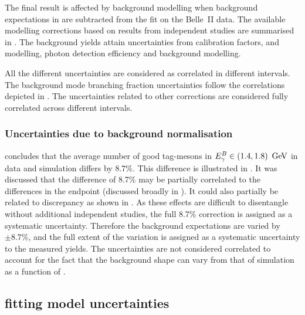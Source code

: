 The final result is affected by background modelling when background expectations in \MC are subtracted from the \Mbc fit on the Belle~II data.
The available modelling corrections based on results from independent studies are summarised in .
The background yields attain uncertainties from \FEI calibration factors, \piVeto and \etaVeto modelling, photon detection efficiency and background modelling. 

All the different uncertainties are considered as correlated in different \EB intervals.
The background mode branching fraction uncertainties follow the correlations depicted in .
The uncertainties related to other corrections are considered fully correlated across different \EB intervals.

\subsubsection{Uncertainties due to background normalisation}\label{sec:background_normalisation_systematic}

 concludes that the average number of 
good tag-\B mesons in ${E^B_{\gamma}}\in(1.4,1.8)~\mathrm{\,Ge\kern -0.1em V}$ in data and simulation differs by $8.7\%$.
This difference is illustrated in .
It was discussed that the difference of 8.7\% may be partially correlated to the differences in the \Mbc endpoint (discussed broadly in ).
It could also partially be related to \ZMVA discrepancy as shown in .
As these effects are difficult to disentangle without additional independent studies, the full 8.7\% correction is assigned as a systematic uncertainty.
Therefore the background expectations are varied by $\pm 8.7\%$, and the full extent of the variation is assigned as a systematic uncertainty to the measured \BtoXsgamma yields.
The uncertainties are not considered correlated to account for the fact that the background shape can vary from that of simulation as a function of \EB.



\subsection{\texorpdfstring{\Mbc}{Mbc} fitting model uncertainties}\label{sec:fit_uncertainties}


